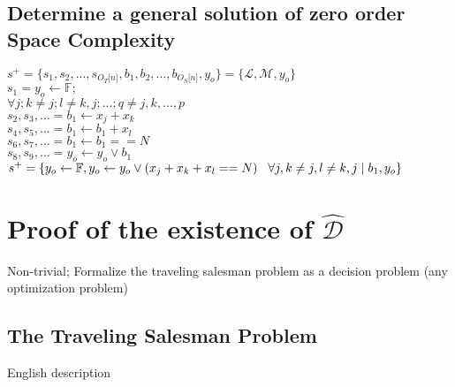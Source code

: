 \documentclass[11pt]{article}
\begin{document}
\subsection{Determine a general solution of zero order Space Complexity}
\begin{center}
\vspace{1.5mm}
$
s^+ = \{ s_1,s_2,...,s_{O_T \lbrack n \rbrack }, b_1, b_2,...,b_{O_S \lbrack n \rbrack},y_o \} = \{ \mathcal{L},\mathcal{M},y_o\}
$
\\ \vspace{2mm}
$
s_1 = y_o \leftarrow \mathbb{F};
$
\\ \vspace{2mm}
$
\forall j; k \neq j; l \neq k,j; ... ; q \neq j,k,...,p
$
\\ \vspace{2mm}
$
s_2,s_3,... =  b_1 \leftarrow x_j + x_k
$
\\ \vspace{2mm}
$
s_4,s_5,... =  b_1 \leftarrow b_1 + x_l
$
\\ \vspace{2mm}
$
s_6,s_7,... = b_1 \leftarrow b_1 == N
$
\\ \vspace{2mm}
$
s_8,s_9,... = y_o \leftarrow y_o \lor b_1
$
\\ \vspace{2mm}
$
s^+ = \{y_o \leftarrow \mathbb{F},y_o \leftarrow y_o \lor (x_j + x_k + x_l == N) \hspace{3mm} \forall j, k \neq j, l \neq k,j \hspace{1mm}| \hspace{1mm} b_1,y_o\}
$
\end{center}






\newpage
\section{Proof of the existence of $\hat{\mathcal{D}}$}
Non-trivial; Formalize the traveling salesman problem as a decision problem (any optimization problem)

\subsection{The Traveling Salesman Problem}
English description
\end{document}
